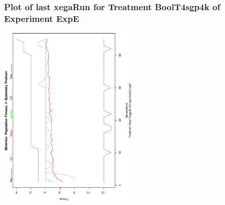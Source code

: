  \begin{frame}
 \frametitle{ Plot of last xegaRun for Treatment BoolT4sgp4k of Experiment ExpE }
 \begin{center}
\includegraphics[width=0.5\textwidth, angle=-90]
{ExpEPlotPopStatsFigure002.eps}
 \end{center}
 \label{report/ExpEPlotPopStatsFigure002.eps}  
 \end{frame}

